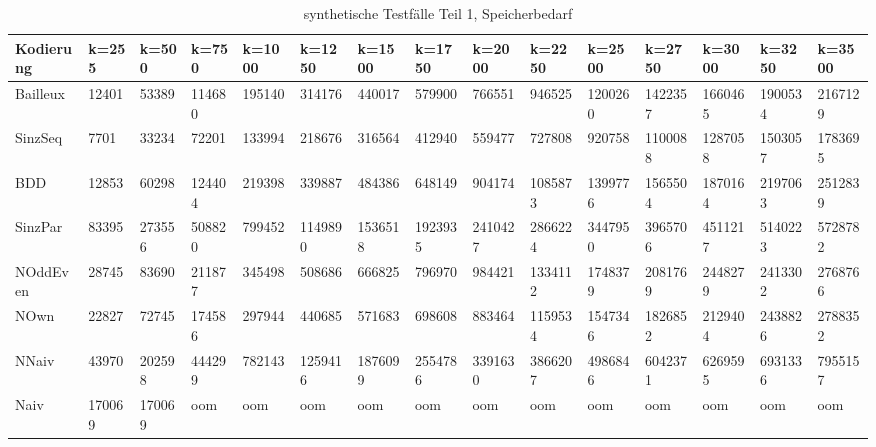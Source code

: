 \documentclass[a4,abstract=on]{scrartcl}
\begin{document}
\begin{landscape}
\begin{adjustwidth*}{-4cm}{-3cm}
\begin{flushleft}
\begin{table}[h!]
    \small
    \setlength{\tabcolsep}{0.11cm}
     \centering
     \begin{tabular}[width=\textwidth]{|l|l|l|l|l|l|l|l|l|l|l|l|l|l|l|}
	\hline
       \textbf{Kodierung}  & \textbf{k=255} & \textbf{k=500} & \textbf{k=750} &\textbf{k=1000} &\textbf{k=1250} &\textbf{k=1500} &\textbf{k=1750} &\textbf{k=2000} &\textbf{k=2250} &\textbf{k=2500} &\textbf{k=2750} &\textbf{k=3000} &\textbf{k=3250} &\textbf{k=3500}\\ 
	\hline
	Bailleux & 12401 & 53389 & 114680 & 195140 & 314176 & 440017 & 579900 & 766551 & 946525 & 1200260 & 1422357 & 1660465 & 1900534 & 2167129 \\
\hline
	SinzSeq &7701 & 33234 & 72201 & 133994 & 218676 & 316564 & 412940 & 559477 & 727808 & 920758 & 1100088 & 1287058 & 1503057 & 1783695 \\
\hline
	BDD & 12853 & 60298 & 124404 & 219398 & 339887 & 484386 & 648149 & 904174 & 1085873 & 1399776 & 1565504 & 1870164 & 2197063 & 2512839 \\
\hline
	SinzPar & 83395 & 273556 & 508820 & 799452 & 1149890 & 1536518 & 1923935 & 2410427 & 2866224 & 3447950 & 3965706 & 4511217 & 5140223 & 5728782  \\
\hline
	NOddEven & 28745 & 83690 & 211877 & 345498 & 508686 & 666825 & 796970 & 984421 & 1334112 & 1748379 & 2081769 & 2448279  & 2413302 & 2768766  \\
\hline
	NOwn & 22827 & 72745 & 174586 & 297944 & 440685 & 571683 & 698608 & 883464 & 1159534 & 1547346 & 1826852 & 2129404 & 2438826 & 2788352 \\
 \hline
	NNaiv & 43970 & 202598 & 444299 & 782143 & 1259416 & 1876099 & 2554786 & 3391630 & 3866207 & 4986846 & 6042371 & 6269595 & 6931336 & 7955157 \\
\hline
	Naiv & 170069 & 170069 &  oom &  oom &  oom &  oom &  oom &  oom &  oom &  oom &  oom &  oom &  oom &  oom\\
\hline
       
     \end{tabular}

     \caption{synthetische Testfälle Teil 1, Speicherbedarf}
     \label{tbl:beispieltabelle}

   \end{table}
	\end{flushleft}
\end{adjustwidth*}


\end{landscape}
\end{document}
